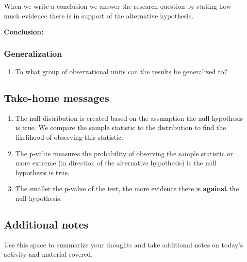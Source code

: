 \documentclass[
]{report}
\providecommand{\tightlist}{%
  \setlength{\itemsep}{0pt}\setlength{\parskip}{0pt}}
\begin{document}
When we write a conclusion we answer the research question by stating how much evidence there is in support of the alternative hypothesis.

\textbf{Conclusion:}

\vspace{1in}

\subsubsection*{Generalization}\label{generalization}

\begin{enumerate}
\def\labelenumi{\arabic{enumi}.}
\setcounter{enumi}{7}
\tightlist
\item
  To what group of observational units can the results be generalized to?
\end{enumerate}

\vspace{0.5in}

\newpage

\subsection{Take-home messages}\label{take-home-messages-4}

\begin{enumerate}
\def\labelenumi{\arabic{enumi}.}
\item
  The null distribution is created based on the assumption the null hypothesis is true. We compare the sample statistic to the distribution to find the likelihood of observing this statistic.
\item
  The p-value measures the probability of observing the sample statistic or more extreme (in direction of the alternative hypothesis) is the null hypothesis is true.
\item
  The smaller the p-value of the test, the more evidence there is \textbf{against} the null hypothesis.
\end{enumerate}

\subsection{Additional notes}\label{additional-notes-4}

Use this space to summarize your thoughts and take additional notes on today's activity and material covered.

\newpage
\end{document}
